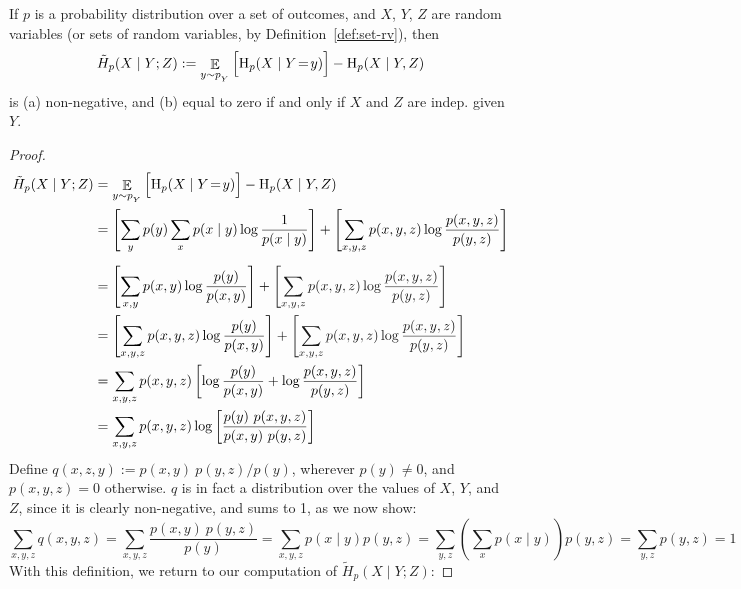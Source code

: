 \documentclass{article}
\begin{document}
\begin{lemma} \label{lem:bnmaxent-component}
	If $p$ is a probability distribution over a set of outcomes, and $X$, $Y$, $Z$ are random variables (or sets of random variables, by Definition~\ref{def:set-rv}), then 
	\[ \tilde H_p(X \mid Y; Z) := \mathop{\mathbb E}_{y \sim p_{_{Y}}} \Big[ \mathrm{H}_p(X \mid Y \!=\!y) \Big]  - \mathrm{H}_p( X \mid Y, Z)\]
	is (a) non-negative, and (b) equal to zero if and only if $X$ and $Z$ are indep. given $Y$.
\end{lemma}
\begin{proof}
	\begin{align*}
		\tilde H_p(X \mid Y; Z) &= \E_{y \sim p_{_{Y}}}  \Big[ \H_p(X \mid Y \!=\!y)\Big] - \H_p( X \mid Y, Z)  \\
		&=  \left[\sum_{y} p(y) \sum_x  p(x\mid y) \log \frac{1}{p(x \mid y)} \right]+ \left[\sum_{x,y, z} p(x, y, z) \log \frac{p(x,y,z)}{p(y, z)}\right] \\[0.5em]
		&= \left[\sum_{x,y} p(x,y) \log \frac{p(y)}{p(x,y)}
			\right] + {\color{inactive}\left[\sum_{x,y, z} p(x, y, z) \log \frac{p(x,y,z)}{p(y, z)} \right]} \\
		&= \left[\sum_{x,y, z} p(x,y ,z) \log \frac{p(y)}{p(x,y)}
			\right] + {\color{inactive}\left[\sum_{x,y, z} p(x, y, z) \log \frac{p(x,y,z)}{p(y, z)} \right]} \\
		&= \sum_{x,y, z} p(x,y ,z) \left[ \log \frac{p(y)}{p(x,y)} + \log \frac{p(x,y,z)}{p(y, z)} \right] \\
		&= \sum_{x,y, z}  p(x,y ,z) \log \left[\frac{p(y)\ p(x,y,z)}{p(x,y)\ p(y,z)} \right]  \\
	\end{align*}
	Define $q(x,z,y) := {p(x,y)\ p(y,z) }/{p(y)}$, wherever $p(y)\neq 0$, and $p(x,y,z) = 0$ otherwise. $q$ is in fact a distribution over the values of $X$, $Y$, and $Z$, since it 
	is clearly non-negative, and sums to 1, as we now show:
	\[
	 \sum_{x,y,z} q(x,y, z) = \sum_{x,y,z} \frac{p(x,y)\ p(y,z)}{p(y)}
		= \sum_{x,y,z} p(x \mid y) p(y,z)
		= \sum_{y,z} \left(\sum_x p(x \mid y)\right) p(y,z)
		= \sum_{y,z}  p(y,z)
		= 1
	\]	
		With this definition, we return to our computation of $\tilde H_p(X \mid Y; Z)$:

\end{proof}
\end{document}
